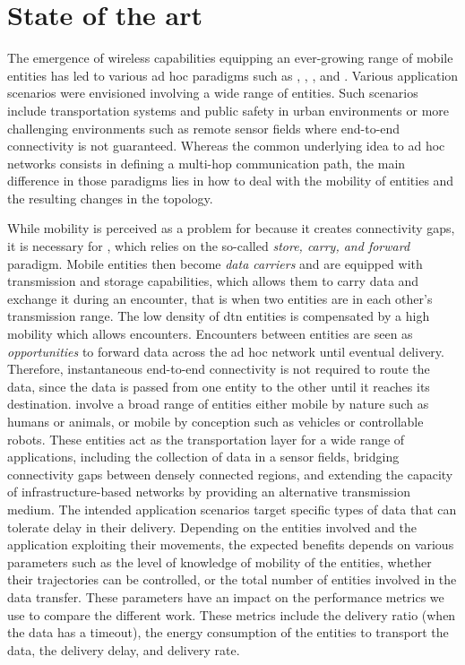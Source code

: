 \chapter{State of the art}
\label{cha:state-of-the-art}

The emergence of wireless capabilities equipping an ever-growing range of mobile entities has led to various ad hoc paradigms such as , , , and . Various application scenarios were envisioned involving a wide range of entities. Such scenarios include transportation systems and public safety in urban environments or more challenging environments such as remote sensor fields where end-to-end connectivity is not guaranteed. Whereas the common underlying idea to ad hoc networks consists in defining a multi-hop communication path, the main difference in those paradigms lies in how to deal with the mobility of entities and the resulting changes in the topology. 

While mobility is perceived as a problem for  because it creates connectivity gaps, it is necessary for , which relies on the so-called \textit{store, carry, and forward} paradigm. Mobile entities then become \textit{data carriers} and are equipped with transmission and storage capabilities, which allows them to carry data and exchange it during an encounter, that is when two entities are in each other's transmission range. The low density of \acrshort{dtn} entities is compensated by a high mobility which allows encounters. Encounters between entities are seen as \textit{opportunities} to forward data across the ad hoc network until eventual delivery. Therefore, instantaneous end-to-end connectivity is not required to route the data, since the data is passed from one entity to the other until it reaches its destination.  involve a broad range of entities either mobile by nature such as humans or animals, or mobile by conception such as vehicles or controllable robots. These entities act as the transportation layer for a wide range of applications, including the collection of data in a sensor fields, bridging connectivity gaps between densely connected regions, and extending the capacity of infrastructure-based networks by providing an alternative transmission medium. The intended application scenarios target specific types of data that can tolerate delay in their delivery. Depending on the entities involved and the application exploiting their movements, the expected benefits depends on various parameters such as the level of knowledge of mobility of the entities, whether their trajectories can be controlled, or the total number of entities involved in the data transfer. These parameters have an impact on the performance metrics we use to compare the different work. These metrics include the delivery ratio (when the data has a timeout), the energy consumption of the entities to transport the data, the delivery delay, and delivery rate.

